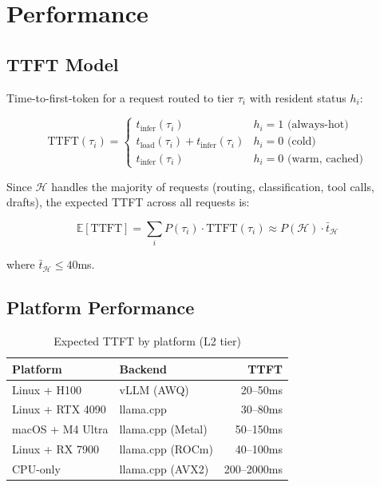 \documentclass[11pt, a4paper, twocolumn]{article}
\begin{document}
\section{Performance}

\subsection{TTFT Model}

Time-to-first-token for a request routed to tier $\tau_i$ with resident status $h_i$:

\begin{equation}
    \text{TTFT}(\tau_i) = 
    \begin{cases}
        t_{\text{infer}}(\tau_i) & h_i = 1 \text{ (always-hot)} \\
        t_{\text{load}}(\tau_i) + t_{\text{infer}}(\tau_i) & h_i = 0 \text{ (cold)} \\
        t_{\text{infer}}(\tau_i) & h_i = 0 \text{ (warm, cached)}
    \end{cases}
\end{equation}

Since $\mathcal{H}$ handles the majority of requests (routing, classification, tool calls, drafts), the expected TTFT across all requests is:

\begin{equation}
    \mathbb{E}[\text{TTFT}] = \sum_{i} P(\tau_i) \cdot \text{TTFT}(\tau_i) \approx P(\mathcal{H}) \cdot \bar{t}_{\mathcal{H}}
\end{equation}

where $\bar{t}_{\mathcal{H}} \leq 40$ms.

\subsection{Platform Performance}

\begin{table}[H]
\centering
\caption{Expected TTFT by platform (L2 tier)}
\small
\begin{tabular}{@{}llr@{}}
\toprule
Platform & Backend & TTFT \\
\midrule
Linux + H100 & vLLM (AWQ) & 20--50ms \\
Linux + RTX 4090 & llama.cpp & 30--80ms \\
macOS + M4 Ultra & llama.cpp (Metal) & 50--150ms \\
Linux + RX 7900 & llama.cpp (ROCm) & 40--100ms \\
CPU-only & llama.cpp (AVX2) & 200--2000ms \\
\bottomrule
\end{tabular}
\end{table}
\end{document}
